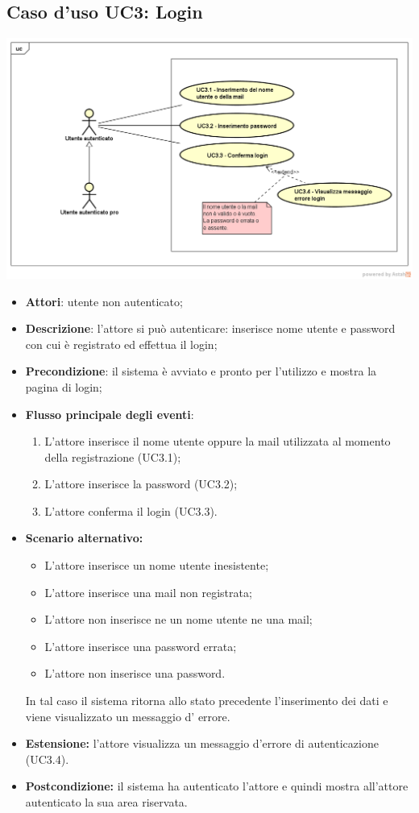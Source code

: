 \subsection{Caso d'uso UC3: Login}
\begin{center}
	\includegraphics[scale=0.5]{UML/UC3.png}
\end{center}
\begin{itemize}
	\item \textbf{Attori}: utente non autenticato;
	\item \textbf{Descrizione}: l'attore si può autenticare: inserisce nome utente e password con cui è registrato ed effettua il login;
	\item \textbf{Precondizione}: il sistema è avviato e pronto per l'utilizzo e mostra la pagina di login;
	\item \textbf{Flusso principale degli eventi}:
	\begin{enumerate}
		\item L'attore inserisce il nome utente oppure la mail utilizzata al momento della registrazione (UC3.1);
		\item L'attore inserisce la password (UC3.2);
		\item L'attore conferma il login (UC3.3).
	\end{enumerate}
	\item \textbf{Scenario alternativo:}
	\begin{itemize}
		\item L'attore inserisce un nome utente inesistente;
		\item L'attore inserisce una mail non registrata;
		\item L'attore non inserisce ne un nome utente ne una mail;
		\item L'attore inserisce una password errata;
		\item L'attore non inserisce una password.
	\end{itemize}
	In tal caso il sistema ritorna allo stato precedente l'inserimento dei dati e viene visualizzato un messaggio d' errore.
	\item \textbf{Estensione:} l'attore visualizza un messaggio d'errore di autenticazione (UC3.4).
	\item \textbf{Postcondizione:} il sistema ha autenticato l'attore e quindi mostra all'attore autenticato la sua area riservata.
\end{itemize}

